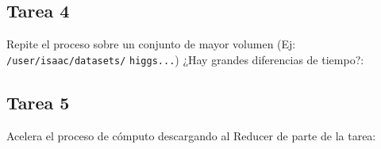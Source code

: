 \subsection{Tarea 4}

Repite el proceso sobre un conjunto de mayor volumen (Ej: \texttt{/user/isaac/datasets/} \texttt{higgs...}) ¿Hay grandes diferencias de tiempo?:


\subsection{Tarea 5}

Acelera el proceso de cómputo descargando al Reducer de parte de la tarea:






